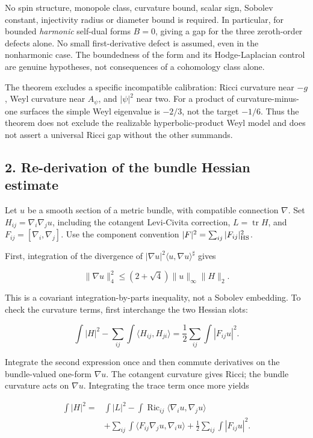 \documentclass[
  10pt,
]{article}
\begin{document}
No spin structure, monopole class, curvature bound, scalar sign, Sobolev
constant, injectivity radius or diameter bound is required. In
particular, for bounded \emph{harmonic} self-dual forms \(B=0\), giving
a gap for the three zeroth-order defects alone. No small
first-derivative defect is assumed, even in the nonharmonic case. The
boundedness of the form and its Hodge-Laplacian control are genuine
hypotheses, not consequences of a cohomology class alone.

The theorem excludes a specific incompatible calibration: Ricci
curvature near \(-g\), Weyl curvature near \(A_\psi\), and \(|\psi|^2\)
near two. For a product of curvature-minus-one surfaces the simple Weyl
eigenvalue is \(-2/3\), not the target \(-1/6\). Thus the theorem does
not exclude the realizable hyperbolic-product Weyl model and does not
assert a universal Ricci gap without the other summands.

\hypertarget{re-derivation-of-the-bundle-hessian-estimate}{%
\subsection{2. Re-derivation of the bundle Hessian
estimate}\label{re-derivation-of-the-bundle-hessian-estimate}}

Let \(u\) be a smooth section of a metric bundle, with compatible
connection \(\nabla\). Set \(H_{ij}=\nabla_i\nabla_j u\), including the
cotangent Levi-Civita correction, \(L=\operatorname{tr}H\), and
\(F_{ij}=[\nabla_i,\nabla_j]\). Use the component convention
\(|F|^2=\sum_{ij}|F_{ij}|_{\rm HS}^2\).

First, integration of the divergence of
\(|\nabla u|^2\langle u,\nabla u\rangle^\sharp\) gives

\[
 \|\nabla u\|_4^2\le(2+\sqrt4)\|u\|_\infty\|H\|_2.
                                                               \tag{2}
\]

This is a covariant integration-by-parts inequality, not a Sobolev
embedding. To check the curvature terms, first interchange the two
Hessian slots:

\[
 \int|H|^2-\sum_{ij}\int\langle H_{ij},H_{ji}\rangle
 =\frac12\sum_{ij}\int|F_{ij}u|^2.
\]

Integrate the second expression once and then commute derivatives on the
bundle-valued one-form \(\nabla u\). The cotangent curvature gives
Ricci; the bundle curvature acts on \(\nabla u\). Integrating the trace
term once more yields

\[
\begin{aligned}
 \int|H|^2={}&\int|L|^2
 -\int\operatorname{Ric}_{ij}\langle\nabla_i u,\nabla_j u\rangle\\
 &+\sum_{ij}\int\langle F_{ij}\nabla_j u,\nabla_i u\rangle
 +\frac12\sum_{ij}\int|F_{ij}u|^2.                         
\end{aligned}\tag{3}
\]
\end{document}
